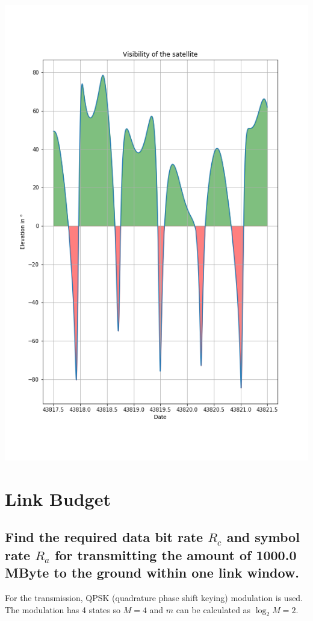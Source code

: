 \documentclass[a4paper,12pt,calibri,oneside,openany]{book}
\theoremstyle{break}
\begin{document}
\begin{center}
	\includegraphics[width=\linewidth]{elevation}
\end{center}
\section{Link Budget}

	\subsection{Find the required data bit rate $R_{c}$ and symbol rate $R_{a}$ for transmitting the amount of 1000.0 MByte to the ground within one link window.}
	
		For the transmission, QPSK (quadrature phase shift keying) modulation is used. The modulation has 4 states so $M=4$ and $m$ can be calculated as $\log_2 M = 2$.
		
\end{document}
